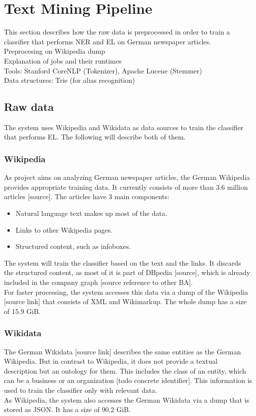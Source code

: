 \section{Text Mining Pipeline}
\label{sec:pipeline}
This section describes how the raw data is preprocessed in order to train a classifier that performs NER and EL on German newspaper articles.
~\\
Preprocesing on Wikipedia dump\\
Explanation of jobs and their runtimes\\
Tools: Stanford CoreNLP (Tokenizer), Apache Lucene (Stemmer)\\
Data structures: Trie (for alias recognition)\\

\subsection{Raw data}
The system uses Wikipedia and Wikidata as data sources to train the classifier that performs EL. The following will describe both of them.

\subsubsection{Wikipedia}
As project aims on analyzing German newspaper articles, the German Wikipedia provides appropriate training data. It currently consists of more than 3.6 million articles [source]. The articles have 3 main components:
\begin{itemize}
\item Natural language text makes up most of the data.
\item Links to other Wikipedia pages.
\item Structured content, such as infoboxes.
\end{itemize}
The system will train the classifier based on the text and the links. It discards the structured content, as most of it is part of DBpedia [source], which is already included in the company graph [source reference to other BA].\\
For faster processing, the system accesses this data via a dump of the Wikipedia [source link] that consists of XML and Wikimarkup. The whole dump has a size of 15.9 GiB.

\subsubsection{Wikidata}
The German Wikidata [source link] describes the same entities as the German Wikipedia. But in contrast to Wikipedia, it does not provide a textual description but an ontology for them. This includes the class of an entity, which can be a business or an organization [todo concrete identifier]. This information is used to train the classifier only with relevant data.\\
As Wikipedia, the system also accesses the German Wikidata via a dump that is stored as JSON. It has a size of 90.2 GiB.

